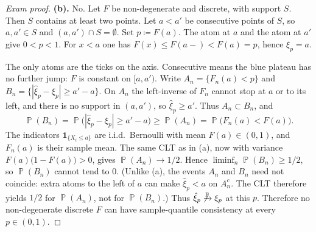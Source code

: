 \documentclass[11pt,a4paper]{article}
\DeclareMathOperator{\Pbb}{\mathbb{P}}
\begin{document}
\begin{proof}[Exam proof]
\textbf{(b).}
No. Let \(F\) be non-degenerate and discrete, with support \(S\). Then \(S\) contains at least two points. Let \(a<a'\) be consecutive points of \(S\), so \(a,a'\in S\) and \((a,a')\cap S=\emptyset\). Set \(p\coloneqq F(a)\). The atom at \(a\) and the atom at \(a'\) give \(0<p<1\). For \(x<a\) one has \(F(x)\le F(a-)<F(a)=p\), hence \(\xi_p=a\).

\begin{center}
\end{center}

The only atoms are the ticks on the axis. Consecutive means the blue plateau has no further jump: \(F\) is constant on \([a,a')\). Write \(A_n=\{F_n(a)<p\}\) and \(B_n=\{|\hat{\xi}_p-\xi_p|\ge a'-a\}\). On \(A_n\) the left-inverse of \(F_n\) cannot stop at \(a\) or to its left, and there is no support in \((a,a')\), so \(\hat{\xi}_p\ge a'\). Thus \(A_n\subset B_n\), and
\[
\Pbb(B_n)
=
\Pbb\bigl(|\hat{\xi}_p-\xi_p|\ge a'-a\bigr)
\ge
\Pbb(A_n)
=
\Pbb\bigl(F_n(a)<F(a)\bigr).
\]
The indicators \(\mathbf{1}_{\{X_i\le a\}}\) are i.i.d.\ Bernoulli with mean \(F(a)\in(0,1)\), and \(F_n(a)\) is their sample mean. The same CLT as in (a), now with variance \(F(a)\bigl(1-F(a)\bigr)>0\), gives \(\Pbb(A_n)\to 1/2\). Hence \(\liminf_n\Pbb(B_n)\ge 1/2\), so \(\Pbb(B_n)\) cannot tend to \(0\). (Unlike (a), the events \(A_n\) and \(B_n\) need not coincide: extra atoms to the left of \(a\) can make \(\hat{\xi}_p<a\) on \(A_n^c\). The CLT therefore yields \(1/2\) for \(\Pbb(A_n)\), not for \(\Pbb(B_n)\).) Thus \(\hat{\xi}_p\not\xrightarrow{\Pbb}\xi_p\) at this \(p\). Therefore no non-degenerate discrete \(F\) can have sample-quantile consistency at every \(p\in(0,1)\).
\end{proof}
\end{document}
